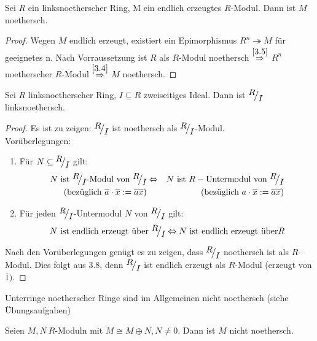 \begin{bem}\label{3.8}
	Sei $R$ ein linksnoetherscher Ring, M ein endlich erzeugtes $R$-Modul. Dann ist $M$ noethersch. 
\end{bem}
\begin{proof}
	Wegen $M$ endlich erzeugt, existiert ein Epimorphismus $R^n \twoheadrightarrow M $ für geeignetes n. Nach Vorraussetzung ist $R$ als $R$-Modul noethersch $\overset{\ref{3.5}}{\Rightarrow} $ $R^n $ noetherscher $R$-Modul $\overset{\ref{3.4}}{\Rightarrow}$ $M$ noethersch.
\end{proof}
\begin{bem}\label{3.9}
	Sei $R$ linksnoetherscher Ring, $I \subseteq R $ zweiseitiges Ideal. Dann ist $\QR{R}{I} $ linksnoethersch.
\end{bem}
\begin{proof}
	Es ist zu zeigen: $\QR{R}{I} $ ist noethersch als $\QR{R}{I} $-Modul. \\
	Vorüberlegungen:
	\begin{enumerate}
		\item Für $N \subseteq \QR{R}{I}$ gilt:
		\begin{eqnarray*}
		N \text{ ist } \QR{R}{I} \text{-Modul von } \QR{R}{I}& \Lra & N \text{ ist } R- \text{Untermodul von } \QR{R}{I}\\
		(\text{bezüglich } \overline{a} \cdot \overline{x}:= \overline{ax}) & & (\text{bezüglich }a \cdot \overline{x} := \overline{ax})
		\end{eqnarray*}
		\item Für jeden $\QR{R}{I} $-Untermodul $N$ von $\QR{R}{I} $ gilt:
		$$ N \text{ ist endlich erzeugt über } \QR{R}{I} \Lra N \text{ ist endlich erzeugt über} R $$ 
	\end{enumerate}
	Nach den Vorüberlegungen genügt es zu zeigen, dass $\QR{R}{I}$ noethersch ist als $R$-Modul. Dies folgt aus 3.8, denn $\QR{R}{I}$ ist endlich erzeugt als $R$-Modul (erzeugt von $\overline{1}).$
\end{proof}
\begin{anm}
	Unterringe noetherscher Ringe sind im Allgemeinen nicht noethersch (siehe Übungsaufgaben)
\end{anm}
\begin{bem}\label{3.10}
	Seien $M,N \ R$-Moduln mit $M \cong M \oplus N, N \neq 0$. Dann ist $M$ nicht noethersch. 
\end{bem}
